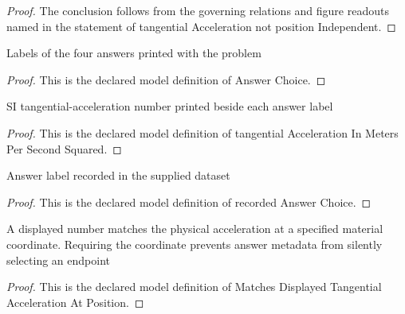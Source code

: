 \begin{proof}
  The conclusion follows from the governing relations and figure readouts named in the statement of tangential Acceleration not position Independent.
\end{proof}
\begin{definition}
  \label{def:physics:phyx-mini-0697:phyxminiproblems-problemphyxmini0697-answerchoice}
  Labels of the four answers printed with the problem
\end{definition}
\begin{proof}
  This is the declared model definition of Answer Choice.
\end{proof}
\begin{definition}
  \label{def:physics:phyx-mini-0697:phyxminiproblems-problemphyxmini0697-answerchoice-tangentialaccelerationinmeterspersecondsquared}
  SI tangential-acceleration number printed beside each answer label
\end{definition}
\begin{proof}
  This is the declared model definition of tangential Acceleration In Meters Per Second Squared.
\end{proof}
\begin{definition}
  \label{def:physics:phyx-mini-0697:phyxminiproblems-problemphyxmini0697-recordedanswerchoice}
  Answer label recorded in the supplied dataset
\end{definition}
\begin{proof}
  This is the declared model definition of recorded Answer Choice.
\end{proof}
\begin{definition}
  \label{def:physics:phyx-mini-0697:phyxminiproblems-problemphyxmini0697-matchesdisplayedtangentialaccelerationatposition}
  A displayed number matches the physical acceleration at a specified material coordinate. Requiring the coordinate prevents answer metadata from silently selecting an endpoint
\end{definition}
\begin{proof}
  This is the declared model definition of Matches Displayed Tangential Acceleration At Position.
\end{proof}
